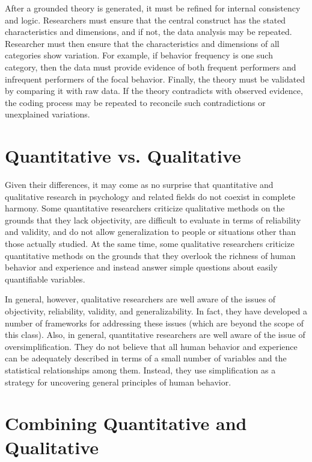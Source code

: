 After a grounded theory is generated, it must be refined for internal consistency and logic. Researchers must ensure that the central construct has the stated characteristics and dimensions, and if not, the data analysis may be repeated. Researcher must then ensure that the characteristics and dimensions of all categories show variation. For example, if behavior frequency is one such category, then the data must provide evidence of both frequent performers and infrequent performers of the focal behavior. Finally, the theory must be validated by comparing it with raw data. If the theory contradicts with observed evidence, the coding process may be repeated to reconcile such contradictions or unexplained variations. 

\section{Quantitative vs. Qualitative}

Given their differences, it may come as no surprise that quantitative and qualitative research in psychology and related fields do not coexist in complete harmony. Some quantitative researchers criticize qualitative methods on the grounds that they lack objectivity, are difficult to evaluate in terms of reliability and validity, and do not allow generalization to people or situations other than those actually studied. At the same time, some qualitative researchers criticize quantitative methods on the grounds that they overlook the richness of human behavior and experience and instead answer simple questions about easily quantifiable variables.

In general, however, qualitative researchers are well aware of the issues of objectivity, reliability, validity, and generalizability. In fact, they have developed a number of frameworks for addressing these issues (which are beyond the scope of this class). Also, in general, quantitative researchers are well aware of the issue of oversimplification. They do not believe that all human behavior and experience can be adequately described in terms of a small number of variables and the statistical relationships among them. Instead, they use simplification as a strategy for uncovering general principles of human behavior.

\section{Combining Quantitative and Qualitative}

